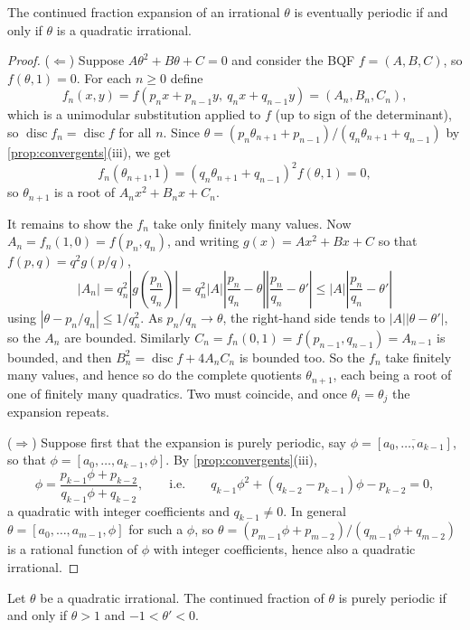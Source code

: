 \documentclass[a4paper]{scrartcl}
\DeclareMathOperator{\disc}{disc}
\begin{document}
\begin{theorem}[Lagrange]\label{thm:lagrangecf}
	The continued fraction expansion of an irrational $\theta$ is eventually periodic if and only if $\theta$ is a quadratic irrational.
\end{theorem}
\begin{proof}
	($\Leftarrow$) Suppose $A\theta^2 + B\theta + C = 0$ and consider the BQF $f = (A, B, C)$, so $f(\theta, 1) = 0$. For each $n \geq 0$ define
	$$
	f_n(x,y) = f(p_nx + p_{n-1}y, \ q_nx+q_{n-1}y) = (A_n, B_n, C_n),
	$$
	which is a unimodular substitution applied to $f$ (up to sign of the determinant), so $\disc f_n = \disc f$ for all $n$. Since $\theta = (p_n\theta_{n+1}+p_{n-1})/(q_n\theta_{n+1}+q_{n-1})$ by \autoref{prop:convergents}(iii), we get
	$$
	f_n(\theta_{n+1}, 1) = (q_n\theta_{n+1}+q_{n-1})^2 f(\theta, 1) = 0,
	$$
	so $\theta_{n+1}$ is a root of $A_nx^2 + B_nx + C_n$.

	It remains to show the $f_n$ take only finitely many values. Now $A_n = f_n(1,0) = f(p_n, q_n)$, and writing $g(x) = Ax^2+Bx+C$ so that $f(p,q) = q^2g(p/q)$,
	$$
	|A_n| = q_n^2\left|g\!\left(\frac{p_n}{q_n}\right)\right| = q_n^2|A|\left|\frac{p_n}{q_n} - \theta\right|\left|\frac{p_n}{q_n}-\theta'\right| \leq |A|\left|\frac{p_n}{q_n} - \theta'\right|
	$$
	using $|\theta - p_n/q_n| \leq 1/q_n^2$. As $p_n/q_n \to \theta$, the right-hand side tends to $|A||\theta - \theta'|$, so the $A_n$ are bounded. Similarly $C_n = f_n(0,1) = f(p_{n-1}, q_{n-1}) = A_{n-1}$ is bounded, and then $B_n^2 = \disc f + 4A_nC_n$ is bounded too. So the $f_n$ take finitely many values, and hence so do the complete quotients $\theta_{n+1}$, each being a root of one of finitely many quadratics. Two must coincide, and once $\theta_i = \theta_j$ the expansion repeats.

	($\Rightarrow$) Suppose first that the expansion is purely periodic, say $\phi = [\overline{a_0, \dots, a_{k-1}}]$, so that $\phi = [a_0, \dots, a_{k-1}, \phi]$. By \autoref{prop:convergents}(iii),
	$$
	\phi = \frac{p_{k-1}\phi + p_{k-2}}{q_{k-1}\phi+q_{k-2}}, \qquad \text{i.e.} \qquad q_{k-1}\phi^2 + (q_{k-2} - p_{k-1})\phi - p_{k-2} = 0,
	$$
	a quadratic with integer coefficients and $q_{k-1} \neq 0$. In general $\theta = [a_0, \dots, a_{m-1}, \phi]$ for such a $\phi$, so $\theta = (p_{m-1}\phi + p_{m-2})/(q_{m-1}\phi+q_{m-2})$ is a rational function of $\phi$ with integer coefficients, hence also a quadratic irrational.
\end{proof}

\begin{theorem}[Galois]\label{thm:galois}
	Let $\theta$ be a quadratic irrational. The continued fraction of $\theta$ is purely periodic if and only if $\theta > 1$ and $-1 < \theta' < 0$.
\end{theorem}
\end{document}
